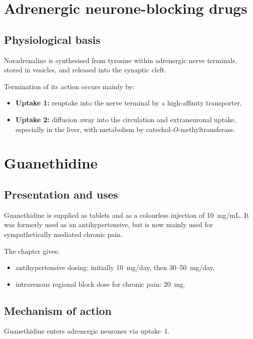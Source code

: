 \documentclass[11pt,a4paper]{article}
\begin{document}
\section{Adrenergic neurone-blocking drugs}

\subsection{Physiological basis}

Noradrenaline is synthesised from tyrosine within adrenergic nerve terminals, stored in vesicles, and released into the synaptic cleft.

Termination of its action occurs mainly by:
\begin{itemize}
    \item \textbf{Uptake 1:} reuptake into the nerve terminal by a high-affinity transporter,
    \item \textbf{Uptake 2:} diffusion away into the circulation and extraneuronal uptake, especially in the liver, with metabolism by catechol-\emph{O}-methyltransferase.
\end{itemize}

\section{Guanethidine}

\subsection{Presentation and uses}

Guanethidine is supplied as tablets and as a colourless injection of 10~mg/mL. It was formerly used as an antihypertensive, but is now mainly used for sympathetically mediated chronic pain.

The chapter gives:
\begin{itemize}
    \item antihypertensive dosing: initially 10~mg/day, then 30--50~mg/day,
    \item intravenous regional block dose for chronic pain: 20~mg.
\end{itemize}

\subsection{Mechanism of action}

Guanethidine enters adrenergic neurones via uptake~1.
\end{document}
